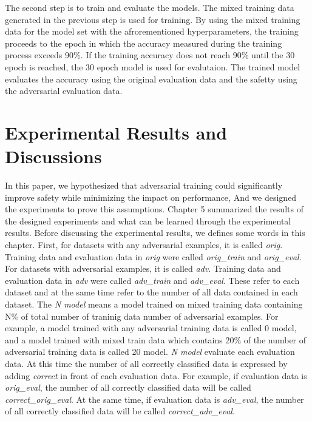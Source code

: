 \documentclass[journal,article,submit,moreauthors,pdftex]{Definitions/mdpi}
\begin{document}
The second step is to train and evaluate the models.
The mixed training data generated in the previous step is used for training.
By using the mixed training data for the model set with the afrorementioned hyperparameters, the training proceeds to the epoch in which the accuracy measured during the training process exceeds 90\%.
If the training accuracy does not reach 90\% until the 30 epoch is reached, the 30 epoch model is used for evalutaion.
The trained model evaluates the accuracy using the original evaluation data and the safetty using the adversarial evaluation data.

\section{Experimental Results and Discussions}

In this paper, we hypothesized that adversarial training could significantly improve safety while minimizing the impact on performance, And we designed the experiments to prove this assumptions.
Chapter 5 summarized the results of the designed experiments and what can be learned through the experimental results.
Before discussing the experimental results, we defines some words in this chapter.
First, for datasets with any adversarial examples, it is called {\it orig}. Training data and evaluation data in {\it orig} were called {\it orig\_train} and {\it orig\_eval}.
For datasets with adversarial examples, it is called {\it adv}. Training data and evaluation data in {\it adv} were called {\it adv\_train} and {\it adv\_eval}.
These refer to each dataset and at the same time refer to the number of all data contained in each dataset.
The {\it N model} means a model trained on mixed training data containing N\% of total number of traninig data number of adversarial examples.
For example, a model trained with any adversarial training data is called 0 model, and a model trained with mixed train data which contains 20\% of the number of adversarial training data is called 20 model.
{\it N model} evaluate each evaluation data. At this time the number of all correctly classified data is expressed by adding {\it correct} in front of each evaluation data.
For example, if evaluation data is {\it orig\_eval}, the number of all correctly classified data will be called {\it correct\_orig\_eval}.
At the same time, if evaluation data is {\it adv\_eval}, the number of all correctly classified data will be called {\it correct\_adv\_eval}.
\end{document}
